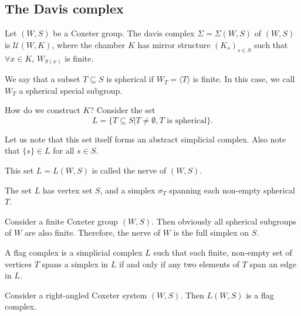 \documentclass[12pt]{article}
\begin{document}
\subsection{The Davis complex}

\begin{definition}
    Let $(W,S)$ be a Coxeter group. The davis complex $\Sigma=\Sigma(W,S)$ of $(W,S)$ is $\mathcal{U}(W,K)$, where  the chamber $K$ has mirror structure $(K_s)_{s\in S}$ such that $\forall x\in K$, $W_{S(x)}$ is finite.
\end{definition}


\begin{definition}
    We say that a subset $T\subseteq S$ is spherical if $W_T=\langle T\rangle$ is finite. In this case, we call $W_T$ a spherical special subgroup.  
\end{definition}

How do we construct $K$? Consider the set 
\[L=\{T\subseteq S|T\neq\emptyset, T\text{ is spherical}\}.\]

Let us note that this set itself forms an abstract simplicial complex. Also note that $\{s\}\in L$ for all $s\in S$. 

\begin{definition}
    This set $L=L(W,S)$ is called the nerve of $(W,S)$. 
\end{definition}

The set $L$ has vertex set $S$, and a simplex $\sigma_T$ spanning each non-empty spherical $T$.

\begin{example}
    Consider a finite Coxeter group $(W,S)$. Then obviously all spherical subgroups of $W$ are also finite. Therefore, the nerve of $W$ is the full simplex on $S$. 
\end{example}

\begin{example}
    
\end{example}


\begin{definition}
    A flag complex is a simplicial complex $L$ such that each finite, non-empty set of vertices $T$ spans a simplex in $L$ if and only if any two elements of $T$ span an edge in $L$. 
\end{definition}

\begin{lemma}
    Consider a right-angled Coxeter system $(W,S)$. Then $L(W,S)$ is a flag complex.
\end{lemma}
\end{document}
